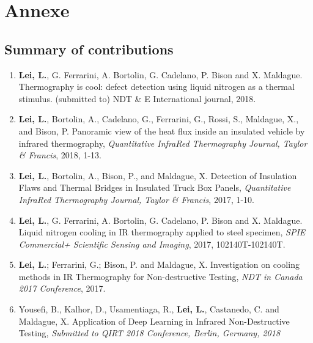 \chapter*{Annexe}     %

\section*{Summary of contributions}

    \begin{enumerate}
        \item \textbf{Lei, L.}, G. Ferrarini, A. Bortolin, G. Cadelano, P. Bison and X. Maldague. Thermography is cool: defect detection using liquid nitrogen as a thermal stimulus. (submitted to) NDT \& E International journal, 2018.

        \item \textbf{Lei, L.}, Bortolin, A., Cadelano, G., Ferrarini, G., Rossi, S., Maldague, X., and Bison, P. Panoramic view of the heat flux inside an insulated vehicle by infrared thermography, \textit{Quantitative InfraRed Thermography Journal, Taylor \& Francis}, 2018, 1-13.

        \item \textbf{Lei, L.}, Bortolin, A., Bison, P., and Maldague, X. 
        Detection of Insulation Flaws and Thermal Bridges in Insulated Truck Box Panels, \textit{Quantitative InfraRed Thermography Journal, Taylor \& Francis}, 2017, 1-10.

        \item \textbf{Lei, L.}, G. Ferrarini, A. Bortolin, G. Cadelano, P. Bison and X. Maldague.
        Liquid nitrogen cooling in IR thermography applied to steel specimen, \textit{SPIE Commercial+ Scientific Sensing and Imaging}, 2017, 102140T-102140T.

        \item \textbf{Lei, L.}; Ferrarini, G.; Bison, P. and Maldague, X. 
        Investigation on cooling methods in IR Thermography for Non-destructive Testing, \textit{NDT in Canada 2017 Conference}, 2017.

        \item Yousefi, B., Kalhor, D., Usamentiaga, R., \textbf{Lei, L.}, Castanedo, C. and Maldague, X.
        Application of Deep Learning in Infrared Non-Destructive Testing, \textit{Submitted to QIRT 2018 Conference, Berlin, Germany, 2018}


\end{enumerate}
